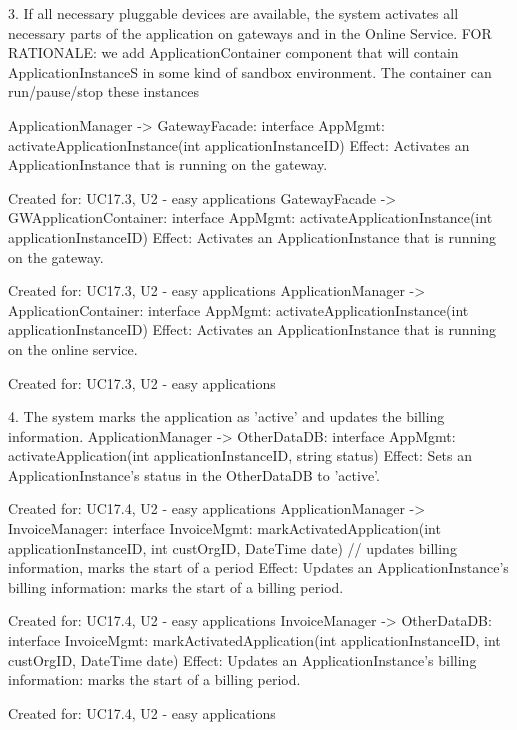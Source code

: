 {{{            3. If all necessary pluggable devices are available, the system activates all necessary parts of the application on gateways and in the Online Service.
                FOR RATIONALE: we add ApplicationContainer component that will contain ApplicationInstanceS in some kind of sandbox environment. The container can run/pause/stop these instances

                ApplicationManager -> GatewayFacade:        interface AppMgmt: activateApplicationInstance(int applicationInstanceID)
                    Effect: Activates an ApplicationInstance that is running on the gateway.
                    \item Created for: UC17.3, U2 - easy applications
                GatewayFacade -> GWApplicationContainer:    interface AppMgmt: activateApplicationInstance(int applicationInstanceID)
                    Effect: Activates an ApplicationInstance that is running on the gateway.
                    \item Created for: UC17.3, U2 - easy applications
                ApplicationManager -> ApplicationContainer: interface AppMgmt: activateApplicationInstance(int applicationInstanceID)
                    Effect: Activates an ApplicationInstance that is running on the online service.
                    \item Created for: UC17.3, U2 - easy applications

            4. The system marks the application as 'active' and updates the billing information.
                ApplicationManager -> OtherDataDB:    interface AppMgmt:     activateApplication(int applicationInstanceID, string status)
                    Effect: Sets an ApplicationInstance's status in the OtherDataDB to 'active'.
                    \item Created for: UC17.4, U2 - easy applications
                ApplicationManager -> InvoiceManager: interface InvoiceMgmt: markActivatedApplication(int applicationInstanceID, int custOrgID, DateTime date) // updates billing information, marks the start of a period
                    Effect: Updates an ApplicationInstance's billing information: marks the start of a billing period.
                    \item Created for: UC17.4, U2 - easy applications
                InvoiceManager -> OtherDataDB:        interface InvoiceMgmt: markActivatedApplication(int applicationInstanceID, int custOrgID, DateTime date)
                    Effect: Updates an ApplicationInstance's billing information: marks the start of a billing period.
                    \item Created for: UC17.4, U2 - easy applications

}}}
